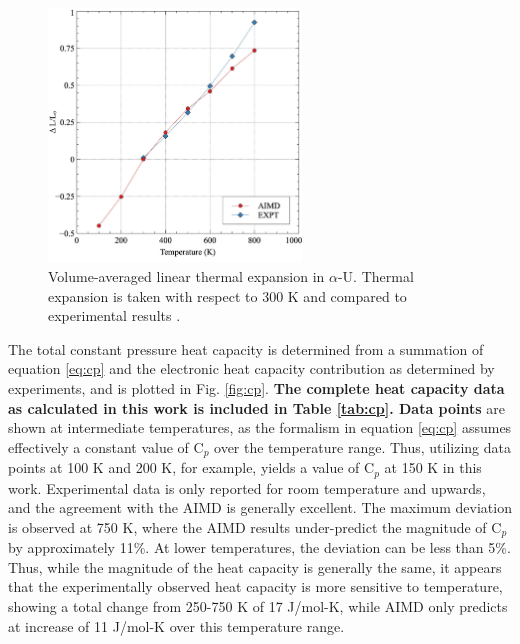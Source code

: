 \documentclass[utf8]{frontiersSCNS} %
\providecommand{\DIFaddtex}[1]{{\bf #1}} %
\providecommand{\DIFdeltex}[1]{} %
\providecommand{\DIFaddbegin}{\protect\color{blue}} %
\providecommand{\DIFaddend}{\protect\color{black}} %
\providecommand{\DIFdelbegin}{\protect\color{red}} %
\providecommand{\DIFdelend}{\protect\color{black}} %
\providecommand{\DIFaddbeginFL}{} %
\providecommand{\DIFaddendFL}{} %
\providecommand{\DIFdelbeginFL}{} %
\providecommand{\DIFdelendFL}{} %
\providecommand{\DIFadd}[1]{\texorpdfstring{\DIFaddtex{#1}}{#1}} %
\providecommand{\DIFdel}[1]{\texorpdfstring{\DIFdeltex{#1}}{}} %
\begin{document}
 \begin{figure}[hbt]
	\centering
	\DIFdelbeginFL %
\DIFdelendFL \DIFaddbeginFL \includegraphics[width=0.6\textwidth]{vte.jpg}
    \DIFaddendFL \caption{Volume-averaged linear thermal expansion in $\alpha$-U. Thermal expansion is taken with respect to 300 K and compared to experimental results \cite{touloukian}.}\label{fig:vol}
\end{figure}

The total constant pressure heat capacity is determined from a summation of equation \ref{eq:cp} and the electronic heat capacity contribution as determined by experiments, and is plotted in Fig. \ref{fig:cp}. \DIFdelbegin \DIFdel{Data point }\DIFdelend \DIFaddbegin \DIFadd{The complete heat capacity data as calculated in this work is included in Table \ref{tab:cp}. Data points }\DIFaddend are shown at intermediate temperatures, as the formalism in equation \ref{eq:cp} assumes effectively a constant value of C$_p$ over the temperature range. Thus, utilizing data points at 100 K and 200 K, for example, yields a value of C$_p$ at 150 K in this work. Experimental data is only reported for room temperature and upwards, and the agreement with the AIMD is generally excellent. The maximum deviation is observed at 750 K, where the AIMD results under-predict the magnitude of C$_p$ by approximately 11\%. At lower temperatures, the deviation can be less than 5\%. Thus, while the magnitude of the heat capacity is generally the same, it appears that the experimentally observed heat capacity is more sensitive to temperature, showing a total change from 250-750 K of 17 J/mol-K, while AIMD only predicts at increase of 11 J/mol-K over this temperature range. 
\end{document}
